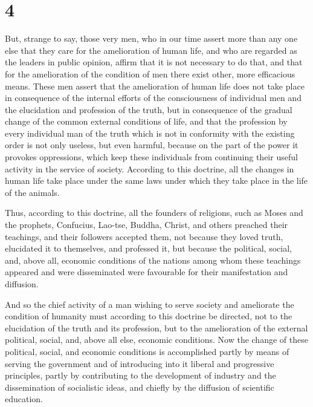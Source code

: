 \documentclass{book}
\begin{document}
\section*{4}
But, strange to say, those very men, who in our time assert more than any one else that they care for the amelioration of human life, and who are regarded as the leaders in public opinion, affirm that it is not necessary to do that, and that for the amelioration of the condition of men there exist other, more efficacious means. These men assert that the amelioration of human life does not take place in consequence of the internal efforts of the consciousness of individual men and the elucidation and profession of the truth, but in consequence of the gradual change of the common external conditions of life, and that the profession by every individual man of the truth which is not in conformity with the existing order is not only useless, but even harmful, because on the part of the power it provokes oppressions, which keep these individuals from continuing their useful activity in the service of society. According to this doctrine, all the changes in human life take place under the same laws under which they take place in the life of the animals.

Thus, according to this doctrine, all the founders of religions, such as Moses and the prophets, Confucius, Lao-tse, Buddha, Christ, and others preached their teachings, and their followers accepted them, not because they loved truth, elucidated it to themselves, and professed it, but because the political, social, and, above all, economic conditions of the nations among whom these teachings appeared and were disseminated were favourable for their manifestation and diffusion.

And so the chief activity of a man wishing to serve society and ameliorate the condition of humanity must according to this doctrine be directed, not to the elucidation of the truth and its profession, but to the amelioration of the external political, social, and, above all else, economic conditions. Now the change of these political, social, and economic conditions is accomplished partly by means of serving the government and of introducing into it liberal and progressive principles, partly by contributing to the development of industry and the dissemination of socialistic ideas, and chiefly by the diffusion of scientific education.
\end{document}
